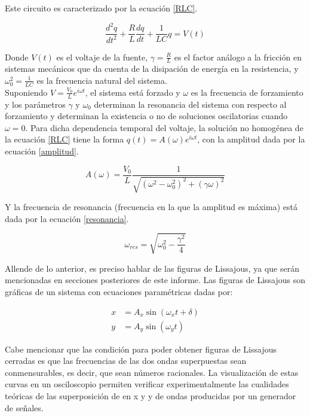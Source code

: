 \documentclass[prb,aps,twocolumn,preprintnumbers,amsmath,amssymb]{revtex4}
\begin{document}
Este circuito es caracterizado por la ecuación \eqref{RLC}.

\begin{equation}
\label{RLC}
\frac{d^2 q}{d t^2} + \frac{R}{L}\frac{d q}{d t} + \frac{1}{LC}q = V(t)
\end{equation}

Donde $V(t)$ es el voltaje de la fuente, $\gamma = \frac{R}{L}$ es el factor análogo a la fricción en sistemas mecánicos que da cuenta de la disipación de energía en la resistencia, y $\omega_{0}^2 = \frac{1}{LC}$ es la frecuencia natural del sistema.\\

Suponiendo $V = \frac{V_{0}}{L} e^{i\omega t}$, el sistema está forzado y $\omega$ es la frecuencia de forzamiento y los parámetros $\gamma$ y $\omega_{0}$ determinan la resonancia del sistema con respecto al forzamiento  y determinan la existencia o no de soluciones oscilatorias cuando $\omega = 0$. Para dicha dependencia temporal del voltaje, la solución no homogénea de la ecuación \eqref{RLC} tiene la forma $q(t) = A(\omega) e^{i \omega t}$, con la amplitud dada por la ecuación \eqref{amplitud}.

\begin{equation}
\label{amplitud}
A(\omega) = \frac{V_{0}}{L}\frac{1}{\sqrt{(\omega^2 - \omega_{0}^2)^2+(\gamma \omega)^2}}
\end{equation}

Y la frecuencia de resonancia (frecuencia en la que la amplitud es máxima) está dada por la ecuación \eqref{resonancia}.

\begin{equation}
\label{resonancia}
\omega_{res} = \sqrt{\omega_{0}^2 - \frac{\gamma^2}{4}}
\end{equation}

Allende de lo anterior, es preciso hablar de las figuras de Lissajous, ya que serán mencionadas en secciones posteriores de este informe. Las figuras de Lissajous son gráficas de un sistema con ecuaciones paramétricas dadas por:

\begin{equation}
\label{lissa}
\begin{split}
x &= A_{x}\sin(\omega_{x}t + \delta)\\
y &= A_{y}\sin(\omega_{y}t)
\end{split}
\end{equation}

Cabe mencionar que las condición para poder obtener figuras de Lissajous cerradas es que las frecuencias de las dos ondas superpuestas sean conmensurables, es decir, que sean números racionales. La visualización de estas curvas en un osciloscopio permiten verificar experimentalmente las cualidades teóricas de las superposición de en x y y de ondas producidas por un generador de señales.
\end{document}
